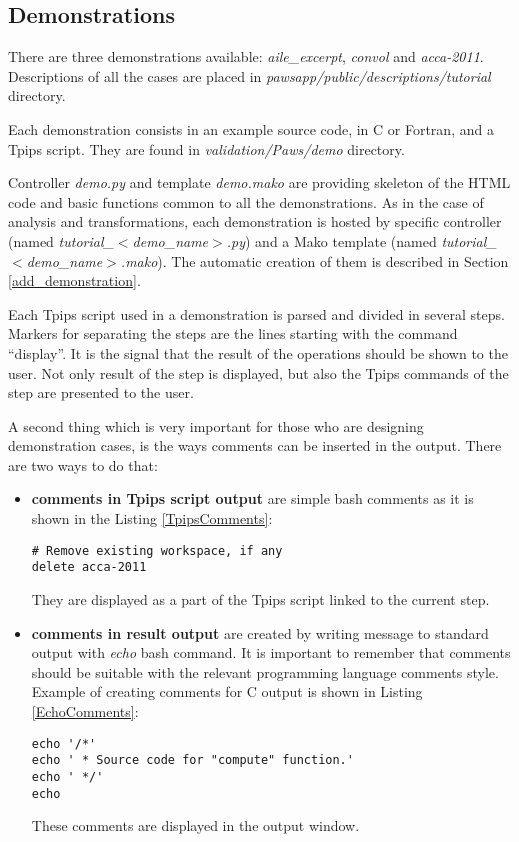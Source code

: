 \subsection{Demonstrations}

There are three demonstrations available: \emph{aile\_excerpt}, \emph{convol} and \emph{acca-2011}. Descriptions of all the cases are placed in \emph{pawsapp/public/descriptions/tutorial} directory.

Each demonstration consists in an example source code, in C or Fortran, and a Tpips script. They are found in \emph{validation/Paws/demo} directory.

Controller \emph{demo.py} and template \emph{demo.mako} are providing skeleton of the HTML code and basic functions common to all the demonstrations. As in the case of analysis and transformations, each demonstration is hosted by specific controller (named \emph{tutorial\_$<$demo\_name$>$.py}) and a Mako template (named \emph{tutorial\_$<$demo\_name$>$.mako}). The automatic creation of them is described in Section \ref{add_demonstration}.

Each Tpips script used in a demonstration is parsed and divided in several steps. Markers for separating the steps are the lines starting with the command ``display''. It is the signal that the result of the operations should be shown to the user. Not only result of the step is displayed, but also the Tpips commands of the step are presented to the user.

A second thing which is very important for those who are designing demonstration cases, is the ways comments can be inserted in the output. There are two ways to do that:

\begin{itemize}
  \item {\bf comments in Tpips script output} are simple bash comments as it is shown in the Listing \ref{TpipsComments}:
  
  \begin{lstlisting}
# Remove existing workspace, if any
delete acca-2011
  \end{lstlisting}
  
  They are displayed as a part of the Tpips script linked to the current step.
  
  \item {\bf comments in result output} are created by writing message to standard output with \emph{echo}\cite{echo} bash\cite{bash} command. It is important to remember that comments should be suitable with the relevant programming language comments style. Example of creating comments for C output is shown in Listing \ref{EchoComments}:
    
  \begin{lstlisting}
echo '/*'
echo ' * Source code for "compute" function.'
echo ' */'
echo
  \end{lstlisting}
  
  These comments are displayed in the output window.
  
\end{itemize}

